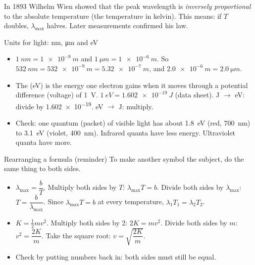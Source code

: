 In 1893 Wilhelm Wien showed that the peak wavelength is \emph{inversely
proportional} to the absolute temperature (the temperature in kelvin). This means:
if $T$ doubles, $\lambda_\mathrm{max}$ halves. Later measurements confirmed his law.

\begin{toolkit}{Units for light: nm, \texorpdfstring{\si{\micro m}}{um} and eV}
\begin{itemize}
  \item $\qty{1}{nm} = \qty{1e-9}{m}$ and $\qty{1}{\micro m} = \qty{1e-6}{m}$.
        So $\qty{532}{nm} = \qty{532e-9}{m} = \qty{5.32e-7}{m}$, and
        $\qty{2.0e-6}{m} = \qty{2.0}{\micro m}$.
  \item The  (eV) is the energy one electron gains when it moves
        through a potential difference (voltage) of \qty{1}{V}.
        $\qty{1}{eV} = \qty{1.602e-19}{J}$ (data sheet).
        J $\to$ eV: divide by \num{1.602e-19}. eV $\to$ J: multiply.
  \item Check: one quantum (packet) of visible light has about \qty{1.8}{eV}
        (red, \qty{700}{nm}) to \qty{3.1}{eV} (violet, \qty{400}{nm}). Infrared
        quanta have less energy. Ultraviolet quanta have more.
\end{itemize}
\end{toolkit}

\begin{toolkit}{Rearranging a formula (reminder)}
To make another symbol the subject, do the same thing to both sides.
\begin{itemize}
  \item $\lambda_\mathrm{max} = \dfrac{b}{T}$. Multiply both sides by $T$:
        $\lambda_\mathrm{max}T = b$. Divide both sides by $\lambda_\mathrm{max}$:
        $T = \dfrac{b}{\lambda_\mathrm{max}}$. Since $\lambda_\mathrm{max}T = b$ at
        every temperature, $\lambda_1T_1 = \lambda_2T_2$.
  \item $K = \frac12 mv^2$. Multiply both sides by 2: $2K = mv^2$. Divide both sides
        by $m$: $v^2 = \dfrac{2K}{m}$. Take the square root: $v = \sqrt{\dfrac{2K}{m}}$.
  \item Check by putting numbers back in: both sides must still be equal.
\end{itemize}
\end{toolkit}


